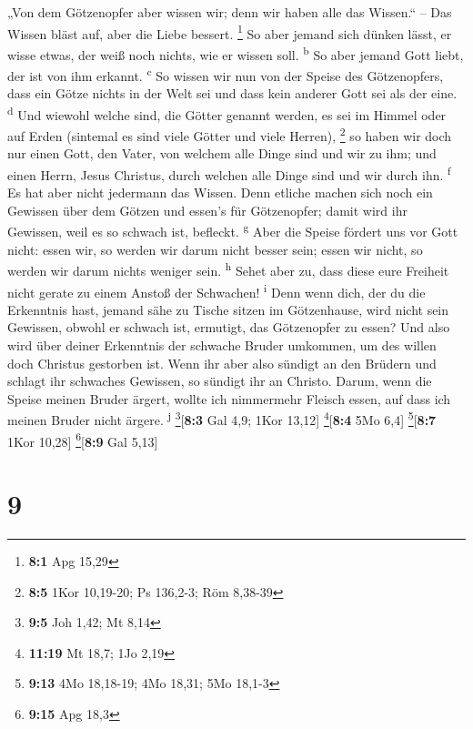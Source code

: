  „Von dem Götzenopfer aber wissen wir; denn wir haben alle
das Wissen.`` -- Das Wissen bläst auf, aber die Liebe bessert.
\footnote{\textbf{8:1} Apg 15,29}  So aber jemand sich
dünken lässt, er wisse etwas, der weiß noch nichts, wie er wissen soll.
\textsuperscript{b}  So aber jemand Gott liebt, der ist
von ihm erkannt. \textsuperscript{c}  So wissen wir nun
von der Speise des Götzenopfers, dass ein Götze nichts in der Welt sei
und dass kein anderer Gott sei als der eine. \textsuperscript{d}
 Und wiewohl welche sind, die Götter genannt werden, es
sei im Himmel oder auf Erden (sintemal es sind viele Götter und viele
Herren), \footnote{\textbf{8:5} 1Kor 10,19-20; Ps 136,2-3; Röm 8,38-39}
 so haben wir doch nur einen Gott, den Vater, von welchem
alle Dinge sind und wir zu ihm; und einen Herrn, Jesus Christus, durch
welchen alle Dinge sind und wir durch ihn. \textsuperscript{f}
 Es hat aber nicht jedermann das Wissen. Denn etliche
machen sich noch ein Gewissen über dem Götzen und essen's für
Götzenopfer; damit wird ihr Gewissen, weil es so schwach ist, befleckt.
\textsuperscript{g}  Aber die Speise fördert uns vor Gott
nicht: essen wir, so werden wir darum nicht besser sein; essen wir
nicht, so werden wir darum nichts weniger sein. \textsuperscript{h}
 Sehet aber zu, dass diese eure Freiheit nicht gerate zu
einem Anstoß der Schwachen! \textsuperscript{i}  Denn
wenn dich, der du die Erkenntnis hast, jemand sähe zu Tische sitzen im
Götzenhause, wird nicht sein Gewissen, obwohl er schwach ist, ermutigt,
das Götzenopfer zu essen?  Und also wird über deiner
Erkenntnis der schwache Bruder umkommen, um des willen doch Christus
gestorben ist.  Wenn ihr aber also sündigt an den Brüdern
und schlagt ihr schwaches Gewissen, so sündigt ihr an Christo.
 Darum, wenn die Speise meinen Bruder ärgert, wollte ich
nimmermehr Fleisch essen, auf dass ich meinen Bruder nicht ärgere.
\textsuperscript{j} \footnote{\textbf{9:5} Joh 1,42; Mt 8,14}{[}\textbf{8:3}
Gal 4,9; 1Kor 13,12{]} \footnote{\textbf{11:19} Mt 18,7; 1Jo 2,19}{[}\textbf{8:4}
5Mo 6,4{]} \footnote{\textbf{9:13} 4Mo 18,18-19; 4Mo 18,31; 5Mo 18,1-3}{[}\textbf{8:7}
1Kor 10,28{]} \footnote{\textbf{9:15} Apg 18,3}{[}\textbf{8:9} Gal
5,13{]}

\hypertarget{section-8}{%
\section{9}\label{section-8}}

